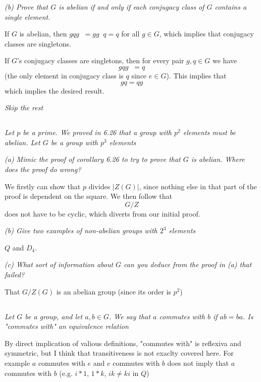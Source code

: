 \documentclass[11pt,oneside,titlepage]{book}
\DeclareMathOperator \inv {^{-1}}
\begin{document}
\textit{(b) Prove that $G$ is abelian if and only if each conjugacy class
  of $G$ contains a single element.}

If $G$ is abelian, then $g q g\inv = g g\inv q = q$ for all $g \in G$,
which implies that conjugacy classes are singletons.

If $G$'s conjugacy classes are singletons, then for every pair $g, q \in G$
we have
$$g q g\inv = q$$
(the only element in conjugacy class is $q$ since $e \in G$).
This implies that
$$gq = qg$$
which implies the desired result.

\textit{Skip the rest}

\subsection{}

\textit{Let $p$ be a prime. We proved in 6.26 that a group with $p^2$
  elements must be abelian. Let $G$ be a group with $p^3$ elements}

\textit{(a) Mimic the proof of corollary 6.26 to try to prove that $G$ is
  abelian. Where does the proof do wrong?}

We firstly can show that $p$ divides $|Z(G)|$, since nothing else in
that part of the proof is dependent on the square. We then follow that
$$G/Z$$
does not have to be cyclic, which diverts from our initial proof.


\textit{(b) Give two examples of non-abelian groups with $2^3$ elements}

$Q$ and $D_4$.

\textit{(c) What sort of information about $G$ can you deduce from the
  proof in (a) that failed?}

That $G/Z(G)$ is an abelian group (since its order is $p^2$)

\subsection{}

\textit{Let $G$ be a group, and let $a, b \in G$. We say that $a$
commutes with $b$ if $ab = ba$. Is "commutes with" an equivalence
relation}

By direct implication of valious definitions, "commutes with"
is reflexiva and symmetric, but I think that transitiveness
is not exaclty covered here. For example $a$ commutes with $e$
and $e$ commutes with $b$ does not imply that $a$ commutes with
$b$ (e.g. $i * 1$, $1 * k$, $ik \neq ki$ in $Q$)
\end{document}
